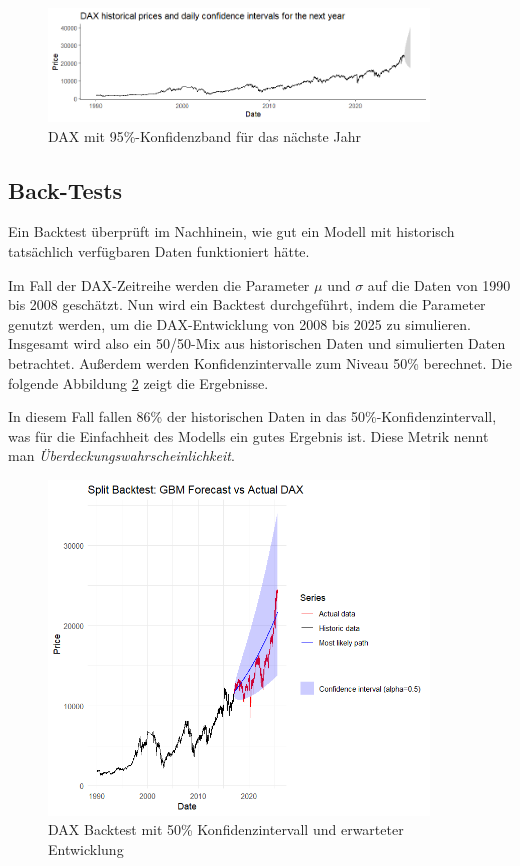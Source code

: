 \begin{figure}[H]
    \centering
    \includegraphics[width=0.9\textwidth]{images/dax_confidence_band.png}
    \caption{DAX mit 95\%-Konfidenzband für das nächste Jahr}
    \label{fig:dax_confidence_band}
\end{figure}

\subsection{Back-Tests}

Ein Backtest überprüft im Nachhinein, wie gut ein Modell mit historisch tatsächlich 
verfügbaren Daten funktioniert hätte.

\begin{bsp}
Im Fall der DAX-Zeitreihe werden die Parameter $\mu$ und $\sigma$ auf die Daten von 1990 bis 2008 geschätzt.
Nun wird ein Backtest durchgeführt, indem die Parameter genutzt werden, um die DAX-Entwicklung von 2008 bis 2025 zu simulieren. Insgesamt 
wird also ein 50/50-Mix aus historischen Daten und simulierten Daten betrachtet. Außerdem 
werden Konfidenzintervalle zum Niveau 50\% berechnet. Die folgende Abbildung
\ref{fig:dax_backtest} zeigt die Ergebnisse.

In diesem Fall fallen 86\% der historischen Daten in das 50\%-Konfidenzintervall,
was für die Einfachheit des Modells ein gutes Ergebnis ist. Diese Metrik nennt 
man \textit{Überdeckungswahrscheinlichkeit}.

\end{bsp}

\begin{figure}
    \centering
    \includegraphics[width=0.9\textwidth]{images/dax_backtest.png}
    \caption{DAX Backtest mit 50\% Konfidenzintervall und erwarteter Entwicklung}
    \label{fig:dax_backtest}
\end{figure}

